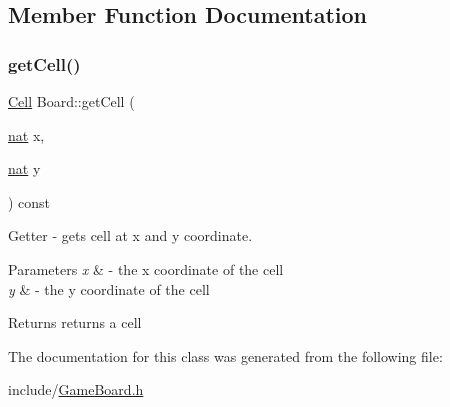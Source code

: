 \subsection{Member Function Documentation}
\mbox{\label{class_board_af3180b2b2f16752be1cde121b7a68bef}} 
\subsubsection{\texorpdfstring{get\+Cell()}{getCell()}}
{\footnotesize\ttfamily \hyperlink{class_cell}{Cell} Board\+::get\+Cell (\begin{DoxyParamCaption}\item[{\hyperlink{_cell_types_8h_a56638ee9d162e8cce3a15f92d2023d6e}{nat}}]{x,  }\item[{\hyperlink{_cell_types_8h_a56638ee9d162e8cce3a15f92d2023d6e}{nat}}]{y }\end{DoxyParamCaption}) const}



Getter -\/ gets cell at x and y coordinate. 


\begin{DoxyParams}{Parameters}
{\em x} & -\/ the x coordinate of the cell \\
\hline
{\em y} & -\/ the y coordinate of the cell \\
\hline
\end{DoxyParams}
\begin{DoxyReturn}{Returns}
returns a cell 
\end{DoxyReturn}


The documentation for this class was generated from the following file\+:\begin{DoxyCompactItemize}
\item 
include/\hyperlink{_game_board_8h}{Game\+Board.\+h}\end{DoxyCompactItemize}
